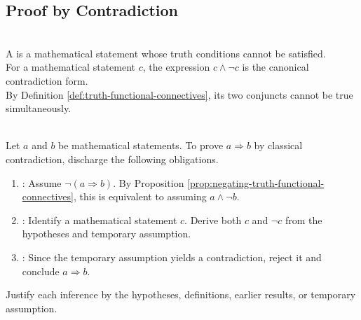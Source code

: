 \subsection{Proof by Contradiction}

\begin{definition} \label{def:contradiction} \\
A  is a mathematical statement whose truth conditions cannot be satisfied.\\
For a mathematical statement $c$, the expression $c\land\neg c$ is the canonical contradiction form.\\
By Definition \ref{def:truth-functional-connectives}, its two conjuncts cannot be true simultaneously.
\end{definition}

\begin{proofmethod} \label{meth:proof-by-contradiction} \\
Let $a$ and $b$ be mathematical statements.
To prove $a\Rightarrow b$ by classical contradiction, discharge the following obligations.
\begin{enumerate}[label=(\roman*)]
\setlength{\itemsep}{0pt}
\item {}: Assume $\neg(a\Rightarrow b)$.
By Proposition \ref{prop:negating-truth-functional-connectives}, this is equivalent to assuming $a\land\neg b$.
\item {}: Identify a mathematical statement $c$.
Derive both $c$ and $\neg c$ from the hypotheses and temporary assumption.
\item {}: Since the temporary assumption yields a contradiction, reject it and conclude $a\Rightarrow b$.
\end{enumerate}
Justify each inference by the hypotheses, definitions, earlier results, or temporary assumption.
\end{proofmethod}
